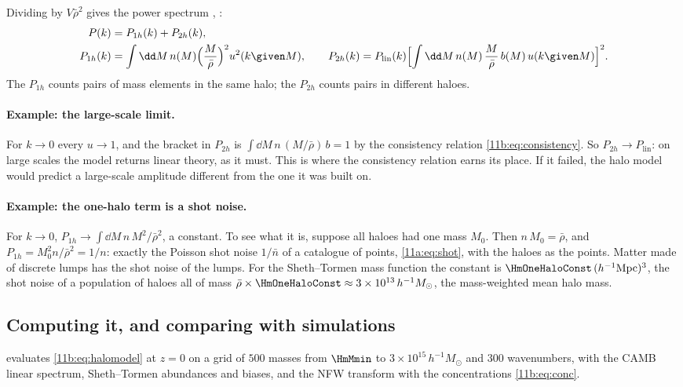 Dividing by $V\bar\rho^2$ gives the  power spectrum
, \cite{Seljak2000}:
\begin{align}
  P(k)&=P_{1h}(k)+P_{2h}(k),\nonumber\\
  P_{1h}(k)&=\int\dd M\,n(M)\Bigl(\frac{M}{\bar\rho}\Bigr)^2u^2(k\given M),
  \qquad
  P_{2h}(k)=P_{\mathrm{lin}}(k)\Bigl[\int\dd M\,n(M)\,\frac{M}{\bar\rho}\,b(M)\,
     u(k\given M)\Bigr]^2 .
  \label{11b:eq:halomodel}
\end{align}
The  $P_{1h}$ counts pairs of mass elements in the same
halo; the  $P_{2h}$ counts pairs in different haloes.

\paragraph{Example: the large-scale limit.}
For $k\to0$ every $u\to1$, and the bracket in $P_{2h}$ is
$\int\dd M\,n\,(M/\bar\rho)\,b=1$ by the consistency relation
\eqref{11b:eq:consistency}. So $P_{2h}\to P_{\mathrm{lin}}$: on large scales the
model returns linear theory, as it must. This is where the consistency relation
earns its place. If it failed, the halo model would predict a large-scale
amplitude different from the one it was built on.

\paragraph{Example: the one-halo term is a shot noise.}
For $k\to0$, $P_{1h}\to\int\dd M\,n\,M^2/\bar\rho^2$, a constant. To see what it
is, suppose all haloes had one mass $M_0$. Then $n\,M_0=\bar\rho$, and
$P_{1h}=M_0^2n/\bar\rho^2=1/n$: exactly the Poisson shot noise $1/\bar n$ of a
catalogue of points, \eqref{11a:eq:shot}, with the haloes as the points. Matter
made of discrete lumps has the shot noise of the lumps. For the Sheth--Tormen
mass function the constant is $\HmOneHaloConst\,(h^{-1}\mathrm{Mpc})^3$, the shot
noise of a population of haloes all of mass
$\bar\rho\times\HmOneHaloConst\approx3\times10^{13}\,h^{-1}M_\odot$, the
mass-weighted mean halo mass.

\subsection{Computing it, and comparing with simulations}
\label{11b:sec:hm-python}

 evaluates \eqref{11b:eq:halomodel} at $z=0$ on a grid of
$500$ masses from $\HmMmin$ to $3\times10^{15}\,h^{-1}M_\odot$ and $300$
wavenumbers, with the CAMB linear spectrum, Sheth--Tormen abundances and biases,
and the NFW transform with the concentrations \eqref{11b:eq:conc}.


